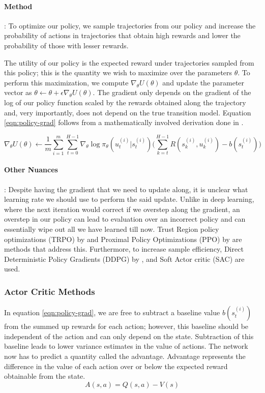 \paragraph{Method}:
To optimize our policy, we sample trajectories from our policy and increase the probability of actions in trajectories that obtain high rewards and lower the probability of those with lesser rewards.

The utility of our policy is the expected reward under trajectories sampled from this policy; this is the quantity we wish to maximize over the parameters $\theta$. To perform this maximization, we compute $\nabla_\theta U(\theta)$ and update the parameter vector as $\theta \leftarrow \theta + \epsilon \nabla_\theta U(\theta)$. The gradient only depends on the gradient of the log of our policy function scaled by the rewards obtained along the trajectory and, very importantly, does not depend on the true transition model. Equation \ref{eqn:policy-grad} follows from a mathematically involved derivation done in \cite{}.

\begin{equation}\label{eqn:policy-grad}
    \nabla_\theta U(\theta) \leftarrow \frac{1}{m} \sum_{i=1}^{m} \sum_{t=0}^{H-1} \nabla_\theta \log \pi_\theta (u_t^{(i)}|s_t^{(i)}) \Bigg(\sum_{k=t}^{H-1} R(s_k^{(i)}, u_k^{(i)}) - b(s_t^{(i)})\Bigg)
\end{equation}

\paragraph{Other Nuances}: Despite having the gradient that we need to update along, it is unclear what learning rate we should use to perform the said update. Unlike in deep learning, where the next iteration would correct if we overstep along the gradient, an overstep in our policy can lead to evaluation over an incorrect policy and can essentially wipe out all we have learned till now. Trust Region policy optimizations (TRPO) by \cite{trpo} and Proximal Policy Optimizations (PPO) by \cite{ppo} are methods that address this. Furthermore, to increase sample efficiency, Direct Deterministic Policy Gradients (DDPG) by \cite{ddpg}, and Soft Actor critic (SAC) \cite{sac} are used.

\subsubsection{Actor Critic Methods}

In equation \ref{eqn:policy-grad}, we are free to subtract a baseline value $b(s_t^{(i)})$ from the summed up rewards for each action; however, this baseline should be independent of the action and can only depend on the state. Subtraction of this baseline leads to lower variance estimates in the value of actions. The network now has to predict a quantity called the advantage. Advantage represents the difference in the value of each action over or below the expected reward obtainable from the state.
\begin{equation}\label{eqn:advantage}
    A(s, a) = Q(s, a) - V(s)
\end{equation}

